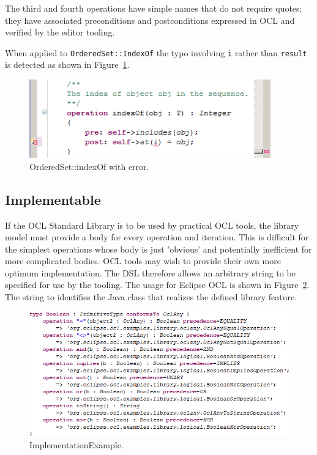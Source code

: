 \documentclass{eceasst}
\begin{document}
The third and fourth operations have simple names that do not require quotes; they have associated preconditions and postconditions expressed in OCL and verified by the editor tooling.

When applied to \verb|OrderedSet::IndexOf| the typo involving \verb|i| rather than \verb|result| is detected as shown in Figure~\ref{fig:OrderedSet_indexOf}.

\begin{figure}
  \begin{center}
    \includegraphics[width=4.1in]{OrderedSet_indexOf.png}
  \end{center}
  \caption{OrderedSet::indexOf with error.}
  \label{fig:OrderedSet_indexOf}
\end{figure}

\subsection{Implementable}

If the OCL Standard Library is to be used by practical OCL tools, the library model must provide a body for every operation and iteration. This is difficult for the simplest operations whose body is just 'obvious' and potentially inefficient for more complicated bodies. OCL tools may wish to provide their own more optimum implementation. The DSL therefore allows an arbitrary string to be specified for use by the tooling. The usage for Eclipse OCL is shown in Figure~\ref{fig:ImplementationExample}. The string to identifies the Java class that realizes the defined library feature.

\begin{figure}
  \begin{center}
    \includegraphics[width=5.75in]{ImplementationExample.png}
  \end{center}
  \caption{ImplementationExample.}
  \label{fig:ImplementationExample}
\end{figure}
\end{document}
